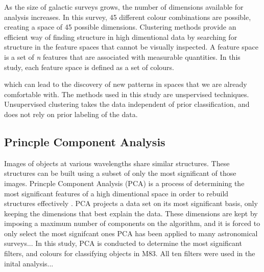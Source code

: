 As the size of galactic surveys grows, the number of dimensions available for analysis increases.
In this survey, 45 different colour combinations are possible, creating a space of 45 possible dimensions. 
Clustering methods provide an efficient way of finding structure in high dimentional data by searching for structure in the feature spaces that cannot be visually inspected. 
A feature space is a set of \textit{n} features that are associated with measurable quantities. 
In this study, each feature space is defined as a set of colours.

which can lead to the discovery of new patterns in spaces that we are already comfortable with. 
The methods used in this study are unspervised techniques. Unsupervised clustering takes the data independent of prior classification, and does not rely on prior labeling of the data.

\subsection{Princple Component Analysis}
Images of objects at various wavelengths share similar structures. These structures can be built using a subset of only the most significant of those images.  
Princple Component Analysis (PCA) is a process of determining the most significant features of a high dimentional space in order to rebuild structures effectively \citet{kuntzer16}.
PCA projects a data set on its most significant basis, only keeping the dimensions that best explain the data. 
These dimensions are kept by imposing a maximum number of components on the algorithm, and it is forced to only select the most signifcant ones \citet{kuntzer16}
PCA has been applied to many astronomical surveys... %
In this study, PCA is conducted to determine the most significant filters, and colours for classifying objects in M83.
All ten filters were used in the inital analysis... %



